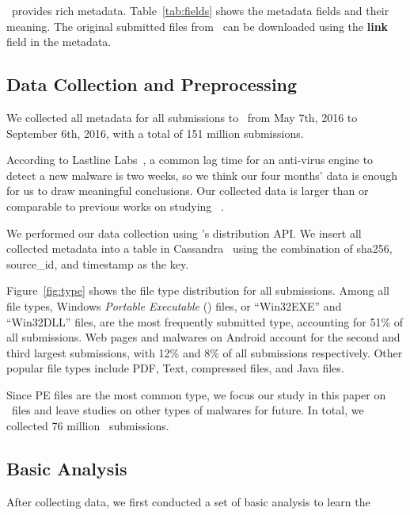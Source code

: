 \vt\ provides rich metadata.
Table~\ref{tab:fields} shows the metadata fields and their meaning.  
The original submitted files from \vt\ can be downloaded using the {\bf link} field in the metadata.

\subsection{Data Collection and Preprocessing}
We collected all metadata for all submissions to \vt\ from May 7th, 2016 to September 6th, 2016,
with a total of 151 million submissions. 

{\color{red}
According to Lastline Labs~\cite{Lastline}, a common lag time for an anti-virus engine to detect a new malware is two weeks,
so we think our four months' data is enough for us to draw  meaningful conclusions. 
Our collected data is larger than or comparable to previous works on studying \vt~\cite{SongAPsys2016,huangvt2016bigdata}.
}

We performed our data collection using \vt{}’s distribution API.
We insert all collected metadata into a table in Cassandra~\cite{cassandra} 
using the combination of sha256, source\_id, and timestamp as the key.



Figure~\ref{fig:type} shows the file type distribution for all submissions. 
Among all file types, Windows \textit{Portable Executable} ({\em \pe}) files, or ``Win32EXE'' and ``Win32DLL'' files, 
are the most frequently submitted type,
accounting for 51\% of all submissions.
Web pages and malwares on Android account for the second and third largest submissions, 
with 12\% and 8\% of all submissions respectively. 
Other popular file types include PDF, Text, compressed files, and Java files. 

Since PE files are the most common type,
we focus our study in this paper on \pe\ files 
and leave studies on other types of malwares for future. 
In total, we collected 76 million \pe\ submissions.

\subsection{Basic Analysis}
After collecting data, we first conducted a set of basic analysis 
to learn the 


